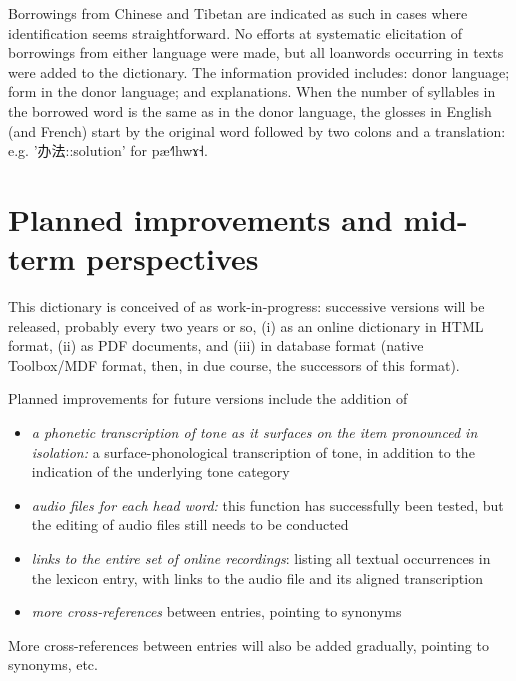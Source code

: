 \documentclass[oldfontcommands,oneside,a4paper,11pt]{article}
\newcommand{\ipa}[1]{{\phon #1}} %
\newcommand{\zh}[1]{{\cn #1}}
\begin{document}
	Borrowings from Chinese and Tibetan are indicated as such in cases where identification seems straightforward. No efforts at systematic elicitation of borrowings from either language were made, but all loanwords occurring in texts were added to the dictionary. The information provided includes: donor language; form in the donor language; and explanations. When the number of syllables in the borrowed word is the same as in the donor language, the glosses in English (and French) start by the original word followed by two colons and a translation: e.g. '\zh{办法}::solution' for \ipa{pæ˧˥hwɤ˧}. 
	
	\section{Planned improvements and mid-term perspectives} \label{sec:improv}
	
	This dictionary is conceived of as work-in-progress: successive versions will be released, probably every two years or so, (i) as an online dictionary in HTML format, (ii) as PDF documents, and (iii) in database format (native Toolbox/MDF format, then, in due course, the successors of this format). 
	
	Planned improvements for future versions include the addition of
	\begin{itemize}
		\item \textit{a phonetic transcription of tone as it surfaces on the item pronounced in isolation:} a surface-phonological transcription of tone, in addition to the indication of the underlying tone category
		\item \textit{audio files for each head word:} this function has successfully been tested, but the editing of audio files still needs to be conducted
		\item \textit{links to the entire set of online recordings}: listing all textual occurrences in the lexicon entry, with links to the audio file and its aligned transcription
		\item \textit{more cross-references} between entries, pointing to synonyms
	\end{itemize}
	
	More cross-references between entries will also be added gradually, pointing to synonyms, etc.
	
\end{document}
